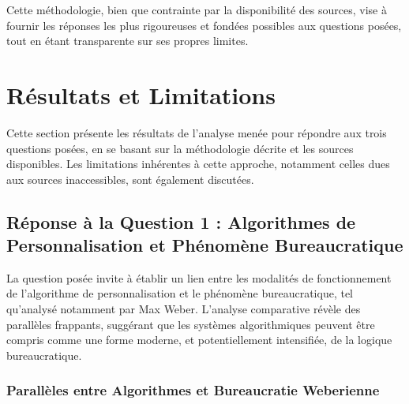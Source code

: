 \documentclass[10pt, twocolumn]{article}
\begin{document}
Cette méthodologie, bien que contrainte par la disponibilité des sources, vise à fournir les réponses les plus rigoureuses et fondées possibles aux questions posées, tout en étant transparente sur ses propres limites.

\section{Résultats et Limitations}

Cette section présente les résultats de l'analyse menée pour répondre aux trois questions posées, en se basant sur la méthodologie décrite et les sources disponibles. Les limitations inhérentes à cette approche, notamment celles dues aux sources inaccessibles, sont également discutées.

\subsection{Réponse à la Question 1 : Algorithmes de Personnalisation et Phénomène Bureaucratique}

La question posée invite à établir un lien entre les modalités de fonctionnement de l'algorithme de personnalisation et le phénomène bureaucratique, tel qu'analysé notamment par Max Weber. L'analyse comparative révèle des parallèles frappants, suggérant que les systèmes algorithmiques peuvent être compris comme une forme moderne, et potentiellement intensifiée, de la logique bureaucratique.

\subsubsection{Parallèles entre Algorithmes et Bureaucratie Weberienne}
\end{document}
